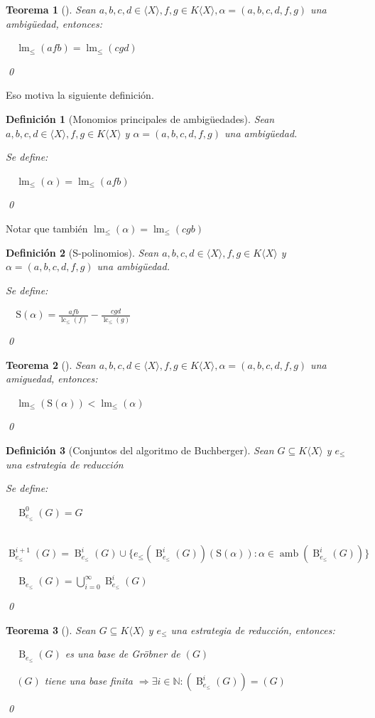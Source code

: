 \documentclass{amsbook}
\theoremstyle{customstyle}
\newtheorem{definition}{Definición}[section]
\newtheorem{theorem}{Teorema}[section]
\newcommand{\definición}[2][]{
  \begin{definition}[#1]
  \setlength{\parindent}{2em} %
  #2
  \qed
  \end{definition}
}
\newcommand{\teorema}[2][]{
  \begin{theorem}[#1]
  \setlength{\parindent}{2em} %
  #2
  \qed
  \end{theorem}
}
\DeclareMathOperator{\lm}{lm}
\DeclareMathOperator{\lc}{lc}
\DeclareMathOperator{\amb}{amb}
\renewcommand{\S}{\text{S}}
\DeclareMathOperator{\B}{B}
\begin{document}
\teorema[]{
Sean $a, b, c, d ∈ ⟨X⟩, f, g ∈ K⟨X⟩, α = (a, b, c, d, f, g)$ una ambigüedad, entonces:

  $\lm_≤{(afb)} = \lm_≤{(cgd)}$

}


Eso motiva la siguiente definición.

\definición[Monomios principales de ambigüedades] {
Sean $a, b, c, d ∈ ⟨X⟩, f, g ∈ K⟨X⟩$ y $α = (a, b, c, d, f, g)$ una ambigüedad.

Se define:

  $\lm_≤{(α)} = \lm_≤{(afb)}$
}
Notar que también $\lm_≤{(α)} = \lm_≤{(cgb)}$ %

\definición[S-polinomios] {
Sean $a, b, c, d ∈ ⟨X⟩, f, g ∈ K⟨X⟩$ y $α = (a, b, c, d, f, g)$ una ambigüedad.

Se define:

  $\S(α) = \frac{afb}{\lc_≤{(f)}} - \frac{cgd}{\lc_≤{(g)}}$
}

\teorema[]{
Sean $a, b, c, d ∈ ⟨X⟩, f, g ∈ K⟨X⟩, α = (a, b, c, d, f, g)$ una amiguedad, entonces:

  $\lm_≤{(\S(α))} < \lm_≤{(α)}$

}


\definición[Conjuntos del algoritmo de Buchberger] {
Sean $G ⊆ K⟨X⟩$ y $e_≤$ una estrategia de reducción

Se define:

  $\B_{e_≤}^0(G) = G$

  $\B_{e_≤}^{i + 1}(G) = \B_{e_≤}^i(G) ∪ \{e_≤(\B_{e_≤}^i(G))(\S(α)) : α ∈ \amb(\B_{e_≤}^i(G))\}$

  $\B_{e_≤}(G) = \bigcup_{i = 0}^∞ \B_{e_≤}^i(G)$

}

\teorema[]{
  Sean $G ⊆ K⟨X⟩$ y $e_≤$ una estrategia de reducción, entonces:

  $\B_{e_≤}(G)$ es una base de Gröbner de $(G)$

  $(G)$ tiene una base finita $⇒ ∃i ∈ ℕ : (\B_{e_≤}^i(G)) = (G)$
}



\end{document}

